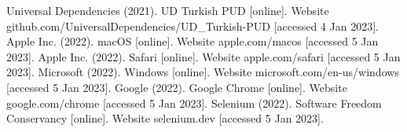 \begin{thebibliography}{99}
 Universal Dependencies (2021). UD Turkish PUD [online]. Website github.com/UniversalDependencies/UD\_Turkish-PUD [accessed 4 Jan 2023].
 Apple Inc. (2022). macOS [online]. Website apple.com/macos [accessed 5 Jan 2023].
 Apple Inc. (2022). Safari [online]. Website apple.com/safari [accessed 5 Jan 2023].
 Microsoft (2022). Windows [online]. Website microsoft.com/en-us/windows [accessed 5 Jan 2023].
 Google (2022). Google Chrome [online]. Website google.com/chrome [accessed 5 Jan 2023].
 Selenium (2022). Software Freedom Conservancy [online]. Website selenium.dev [accessed 5 Jan 2023].
\end{thebibliography}